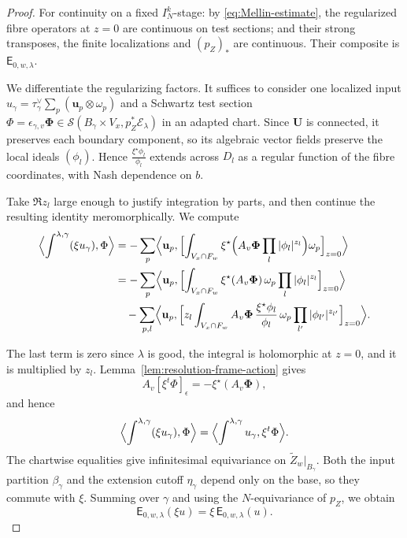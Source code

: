 \documentclass[a4paper,12pt]{amsart}
\numberwithin{equation}{section}
\theoremstyle{definition}
\theoremstyle{remark}
\newcommand{\U}{\mathbf U}
\newcommand{\IN}{I_N}
\newcommand{\mcS}{\mathcal S}
\newcommand{\mcE}{\mathcal E}
\newcommand{\E}{\mathsf E}
\begin{document}
\begin{proof}
For continuity on a fixed $\IN^k$-stage: by \eqref{eq:Mellin-estimate}, the regularized fibre operators at $z=0$ are continuous on test sections; and their strong transposes, the finite localizations and $(p_Z)_*$ are continuous. Their composite is $\E_{0,w,\lambda}$.

We differentiate the regularizing factors. It suffices to consider one localized input $u_\gamma=\tau_\gamma^\vee\sum_p(\mathbf u_p\otimes\omega_p)$ and a Schwartz test section $\Phi=\epsilon_{\gamma,v}\boldsymbol\Phi\in\mcS(B_\gamma\times V_x,p_Z^*\mcE_\lambda)$ in an adapted chart. Since $\U$ is connected, it preserves each boundary component, so its algebraic vector fields preserve the local ideals $(\phi_l)$. Hence
$\frac{\xi^\star\phi_l}{\phi_l}$
extends across $D_l$ as a regular function of the fibre coordinates, with Nash dependence on $b$.

Take $\Re z_l$ large enough to justify integration by parts, and then continue the resulting identity meromorphically. We compute
\begin{equation}\label{eq:regularized-equivariance}
\begin{aligned}
 \Bigl\langle\int^{\lambda,\gamma}(\xi u_\gamma),\Phi\Bigr\rangle
 &=-\sum_p\Bigl\langle\mathbf u_p,\Bigl[\int_{V_x\cap F_w}\xi^\star\Bigl(A_v\boldsymbol\Phi\prod_l|\phi_l|^{z_l}\Bigr)\omega_p\Bigr]_{z=0}\Bigr\rangle\\
 &=-\sum_p\Bigl\langle\mathbf u_p,\Bigl[\int_{V_x\cap F_w}\xi^\star(A_v\boldsymbol\Phi)\,\omega_p\prod_l|\phi_l|^{z_l}\Bigr]_{z=0}\Bigr\rangle\\
 &\quad-\sum_{p,l}\Bigl\langle\mathbf u_p,\Bigl[z_l\int_{V_x\cap F_w}A_v\boldsymbol\Phi\,\frac{\xi^\star\phi_l}{\phi_l}\,\omega_p\prod_{l'}|\phi_{l'}|^{z_{l'}}\Bigr]_{z=0}\Bigr\rangle.
\end{aligned}
\end{equation}

The last term is zero since $\lambda$ is good, the integral is holomorphic at $z=0$, and it is multiplied by $z_l$. Lemma~\ref{lem:resolution-frame-action} gives
\[
 A_v[\xi^t\Phi]_\epsilon=-\xi^\star(A_v\boldsymbol\Phi),
\]
and hence
\[
 \Bigl\langle\int^{\lambda,\gamma}(\xi u_\gamma),\Phi\Bigr\rangle=\Bigl\langle\int^{\lambda,\gamma}u_\gamma,\xi^t\Phi\Bigr\rangle.
\]
The chartwise equalities give infinitesimal equivariance on $\tilde Z_w|_{B_\gamma}$. Both the input partition $\beta_\gamma$ and the extension cutoff $\eta_\gamma$ depend only on the base, so they commute with $\xi$. Summing over $\gamma$ and using the $N$-equivariance of $p_Z$, we obtain
\[
 \E_{0,w,\lambda}(\xi u)=\xi\,\E_{0,w,\lambda}(u).
\]
\end{proof}
\end{document}
